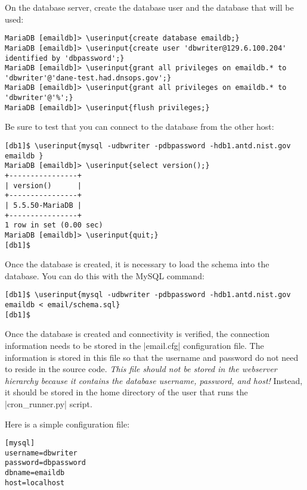 \documentclass[preprint,3p,11pt]{elsarticle}
\newcommand\userinput[1]{\textbf{#1}}
\begin{document}
On the database server, create the database user and the database that
will be used:

\begin{Verbatim}[commandchars=\\\{\}]
MariaDB [emaildb]> \userinput{create database emaildb;}
MariaDB [emaildb]> \userinput{create user 'dbwriter@129.6.100.204' identified by 'dbpassword';}
MariaDB [emaildb]> \userinput{grant all privileges on emaildb.* to 'dbwriter'@'dane-test.had.dnsops.gov';}
MariaDB [emaildb]> \userinput{grant all privileges on emaildb.* to 'dbwriter'@'%';}
MariaDB [emaildb]> \userinput{flush privileges;}
\end{Verbatim}

Be sure to test that you can connect to the database from the other host:

\begin{Verbatim}[commandchars=\\\{\}]
[db1]$ \userinput{mysql -udbwriter -pdbpassword -hdb1.antd.nist.gov emaildb }
MariaDB [emaildb]> \userinput{select version();}
+----------------+
| version()      |
+----------------+
| 5.5.50-MariaDB |
+----------------+
1 row in set (0.00 sec)
MariaDB [emaildb]> \userinput{quit;}
[db1]$ 
\end{Verbatim}

Once the database is created, it is necessary to load the schema into
the database. You can do this with the MySQL command:

\begin{Verbatim}[commandchars=\\\{\}]
[db1]$ \userinput{mysql -udbwriter -pdbpassword -hdb1.antd.nist.gov emaildb < email/schema.sql}
[db1]$
\end{Verbatim}

Once the database is created and connectivity is verified, the
connection information needs to be stored in the 
|email.cfg| configuration file. The information is stored in this file
so that the username and password do not need to reside in the source
code. \emph{This file should not be stored in the webserver
  hierarchy because it contains the database username, password, and
  host!} Instead, it should be stored in the home directory of the
user that runs the |cron_runner.py| script.

Here is a simple configuration file:

\begin{lstlisting}
[mysql]
username=dbwriter
password=dbpassword
dbname=emaildb
host=localhost
\end{lstlisting}
\end{document}
